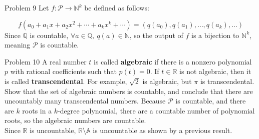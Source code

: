 \documentclass[10pt]{extarticle}
\begin{document}
{\begin{problem}{Problem 9}
    Let $f: \mathcal{P} \rightarrow \mathbb{N}^k$ be defined as follows:

    \[
      f(a_0 + a_1x + a_2x^2 + \cdots + a_kx^k + \cdots) = (q(a_0),q(a_1),\dots,q(a_k),\dots)
    \] 
    Since $\mathbb{Q}$ is countable, $\forall a\in \mathbb{Q},~q(a)\in \mathbb{N}$, so the output of $f$ is a bijection to $\mathbb{N}^k$, meaning $\mathcal{P}$ is countable.
  \end{problem}
  \begin{problem}{Problem 10}
    A real number $t$ is called \textbf{algebraic} if there is a nonzero polynomial $p$ with rational coefficients such that $p(t) = 0$. If $t\in \mathbb{R}$ is not algebraic, then it is called \textbf{transcendental}. For example, $\sqrt{2}$ is algebraic, but $\pi$ is transcendental. Show that the set of algebraic numbers is countable, and conclude that there are uncountably many transcendental numbers.
    \tcblower
    Because $\mathcal{P}$ is countable, and there are $k$ roots in a $k$-degree polynomial, there are a countable number of polynomial roots, so the algebraic numbers are countable.\\

    Since $\mathbb{R}$ is uncountable, $\mathbb{R}\setminus\mathbb{A}$ is uncountable as shown by a previous result.
  \end{problem}
}
\end{document}
